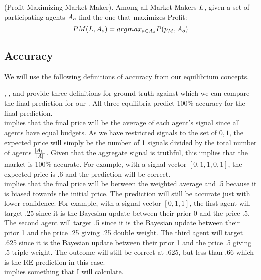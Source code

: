 \begin{definition} (Profit-Maximizing Market Maker).
\label{def:pmmm}
Among all Market Makers $L$, given a set of participating agents $A_o$ find the one that maximizes Profit:
$$ PM(L, A_o) = arg max_{a \in A_o} P(p_M, A_o)$$
\end{definition}

\subsection{Accuracy}
We will use the following definitions of accuracy from our equilibrium concepts.

, , and  provide three definitions for ground truth against which we can compare the final prediction for our . All three equilibria predict 100\% accuracy for the final prediction. \\

 implies that the final price will be the average of each agent's signal since all agents have equal budgets. As we have restricted signals to the set of ${0,1}$, the expected price will simply be the number of 1 signals divided by the total number of agents $\frac{|A_1|}{|A|}$. Given that the aggregate signal is truthful, this implies that the market is 100\% accurate. For example, with a signal vector $\left[0,1,1,0,1\right]$, the expected price is .6 and the prediction will be correct. \\

 implies that the final price will be between the weighted average and .5 because it is biased towards the initial price. The prediction will still be accurate just with lower confidence. For example, with a signal vector $\left[0,1,1\right]$, the first agent will target .25 since it is the Bayesian update between their prior 0 and the price .5. The second agent will target .5 since it is the Bayesian update between their prior 1 and the price .25 giving .25 double weight. The third agent will target .625 since it is the Bayesian update between their prior 1 and the price .5 giving .5 triple weight. The outcome will still be correct at .625, but less than .66 which is the RE prediction in this case.\\

 implies something that I will calculate.\\
